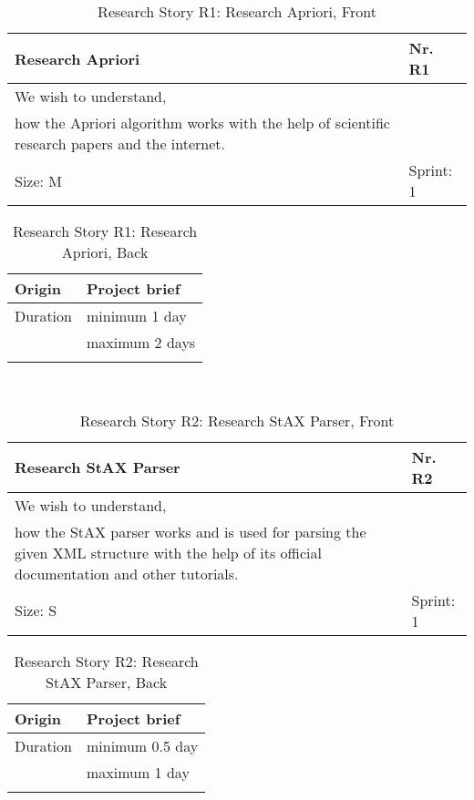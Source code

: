 \begin{table}[H]
  \caption{Research Story R1: Research Apriori, Front}
  \label{Story_R1_Front}
  \centering
  \begin{tabular}{|p{9cm} p{2cm}|}
	\hline  	
  	Research Apriori & Nr. R1 \\ 
  	\hline
  	We wish to understand, &    \\ 
  	how the Apriori algorithm works with the help of scientific research papers and the internet. &    \\ 
  	Size: M & Sprint: 1 \\ 
  	\hline
  \end{tabular}
\end{table}
\begin{table}[H]
  \caption{Research Story R1: Research Apriori, Back}
  \label{Story_R1_Back}
  \centering
  \begin{tabular}{|p{4cm} p{7cm}|}
  \hline 
 	Origin & Project brief  \\ 
  	\hline
  	Duration & minimum 1 day \\ 
  	 & maximum 2 days \\ 
  	 
  	  &  
  	   \\ 
  	\hline
  \end{tabular}
\end{table} 

\ \\

\begin{table}[H]
  \caption{Research Story R2: Research StAX Parser, Front}
  \label{Story_R2_Front}
  \centering
  \begin{tabular}{|p{9cm} p{2cm}|}
	\hline  	
  	Research StAX Parser & Nr. R2 \\ 
  	\hline
  	We wish to understand, &    \\ 
  	how the StAX parser works and is used for parsing the given XML structure with the help of its official documentation and other tutorials. &    \\ 
  	Size: S & Sprint: 1 \\ 
  	\hline
  \end{tabular}
\end{table}
\begin{table}[H]
  \caption{Research Story R2: Research StAX Parser, Back}
  \label{Story_R2_Back}
  \centering
  \begin{tabular}{|p{4cm} p{7cm}|}
  \hline 
 	Origin & Project brief  \\ 
  	\hline
  	Duration & minimum 0.5 day \\ 
  	 & maximum 1 day \\ 
  	 
  	  &  
  	   \\ 
  	\hline
  \end{tabular}
\end{table} 

